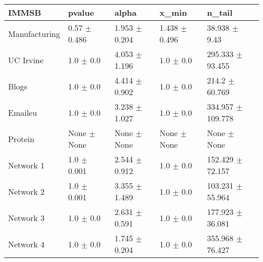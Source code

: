 \begin{tabular}{@{}lllll@{}}
\toprule

\textbf{IMMSB} & pvalue & alpha & x\_min & n\_tail \\\midrule

Manufacturing & 0.57 \(\pm\) 0.486 & 1.953 \(\pm\) 0.204 & 1.438 \(\pm\)
0.496 & 38.938 \(\pm\) 9.43 \\
UC Irvine & 1.0 \(\pm\) 0.0 & 4.053 \(\pm\) 1.196 & 1.0 \(\pm\)
0.0 & 295.333 \(\pm\) 93.455 \\
Blogs & 1.0 \(\pm\) 0.0 & 4.414 \(\pm\) 0.902 & 1.0 \(\pm\) 0.0 & 214.2
\(\pm\) 60.769 \\
Emaileu & 1.0 \(\pm\) 0.0 & 3.238 \(\pm\) 1.027 & 1.0 \(\pm\)
0.0 & 334.957 \(\pm\) 109.778 \\
Protein & None \(\pm\) None & None \(\pm\) None & None \(\pm\)
None & None \(\pm\) None \\
Network 1 & 1.0 \(\pm\) 0.001 & 2.544 \(\pm\) 0.912 & 1.0 \(\pm\)
0.0 & 152.429 \(\pm\) 72.157 \\
Network 2 & 1.0 \(\pm\) 0.001 & 3.355 \(\pm\) 1.489 & 1.0 \(\pm\)
0.0 & 103.231 \(\pm\) 55.964 \\
Network 3 & 1.0 \(\pm\) 0.0 & 2.631 \(\pm\) 0.591 & 1.0 \(\pm\)
0.0 & 177.923 \(\pm\) 36.081 \\
Network 4 & 1.0 \(\pm\) 0.0 & 1.745 \(\pm\) 0.204 & 1.0 \(\pm\)
0.0 & 355.968 \(\pm\) 76.427 \\

\bottomrule
\end{tabular}

